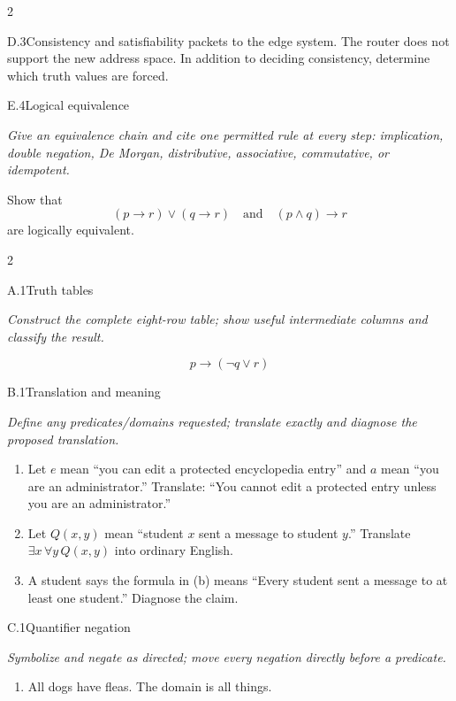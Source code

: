 \documentclass[9pt]{extarticle}
\begin{document}
\begin{multicols}{2}
\begin{CoreProblem}{D.3}{Consistency and satisfiability}
packets to the edge system. The router does not support the new address space.
In addition to deciding consistency, determine which truth values are forced.
\end{CoreProblem}
\begin{CoreProblem}{E.4}{Logical equivalence}
{\scriptsize\textit{Give an equivalence chain and cite one permitted rule at every step: implication, double negation, De Morgan, distributive, associative, commutative, or idempotent.}\par}
Show that
\[
  (p\to r)\lor(q\to r)
  \quad\text{and}\quad
  (p\land q)\to r
\]
are logically equivalent.
\end{CoreProblem}
\end{multicols}
\CoreWorkArea
\FormBreak
{}
\begin{multicols}{2}
\begin{CoreProblem}{A.1}{Truth tables}
{\scriptsize\textit{Construct the complete eight-row table; show useful intermediate columns and classify the result.}\par}
\[
  p\to(\neg q\lor r)
\]
\end{CoreProblem}
\begin{CoreProblem}{B.1}{Translation and meaning}
{\scriptsize\textit{Define any predicates/domains requested; translate exactly and diagnose the proposed translation.}\par}
\begin{enumerate}[label=(\alph*)]
  \item Let $e$ mean ``you can edit a protected encyclopedia entry'' and $a$
        mean ``you are an administrator.'' Translate: ``You cannot edit a
        protected entry unless you are an administrator.''
  \item Let $Q(x,y)$ mean ``student $x$ sent a message to student $y$.''
        Translate $\exists x\,\forall y\,Q(x,y)$ into ordinary English.
  \item A student says the formula in (b) means ``Every student sent a message
        to at least one student.'' Diagnose the claim.
\end{enumerate}
\end{CoreProblem}
\begin{CoreProblem}{C.1}{Quantifier negation}
{\scriptsize\textit{Symbolize and negate as directed; move every negation directly before a predicate.}\par}
\begin{enumerate}[label=(\alph*)]
  \item All dogs have fleas. The domain is all things.

\end{enumerate}
\end{CoreProblem}
\end{multicols}
\end{document}
